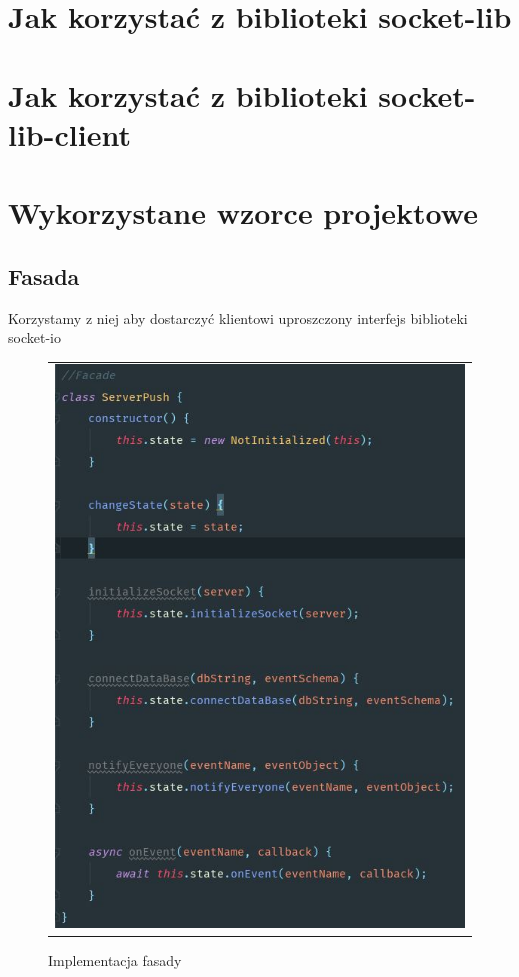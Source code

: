 \documentclass{sprawozdanie-agh}
\begin{document}
	
	\section{Jak korzystać z biblioteki socket-lib}
	
	\section{Jak korzystać z biblioteki socket-lib-client}
	
	\section{Wykorzystane wzorce projektowe}
	\subsection{Fasada}
	
	Korzystamy z niej aby dostarczyć klientowi uproszczony interfejs biblioteki socket-io
	
	\begin{figure}[H] 
		\centering
		\begin{tabular}{c}
			\includegraphics[width=.75\textwidth]{Fasada}
		\end{tabular} 
		\caption{Implementacja fasady}
	\end{figure}
	
\end{document}
